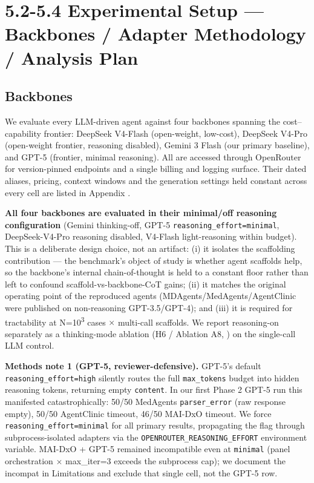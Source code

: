 \section{5.2-5.4 Experimental Setup --- Backbones / Adapter Methodology / Analysis Plan}\label{experimental-setup-backbones-adapter-methodology-analysis-plan}

\subsection{Backbones}\label{sec-5-2}

We evaluate every LLM-driven agent against four backbones spanning the
cost--capability frontier: DeepSeek V4-Flash (open-weight, low-cost), DeepSeek
V4-Pro (open-weight frontier, reasoning disabled), Gemini 3 Flash (our primary
baseline), and GPT-5 (frontier, minimal reasoning). All are accessed through
OpenRouter for version-pinned endpoints and a single billing and logging
surface. Their dated aliases, pricing, context windows and the generation
settings held constant across every cell are listed in Appendix
.

\textbf{All four backbones are evaluated in their minimal/off reasoning configuration} (Gemini thinking-off, GPT-5 \texttt{reasoning\_effort=minimal},
DeepSeek-V4-Pro reasoning disabled, V4-Flash light-reasoning within budget).
This is a deliberate design choice, not an artifact: (i) it isolates the scaffolding contribution --- the benchmark's object of study is whether agent
scaffolds help, so the backbone's internal chain-of-thought is held to a
constant floor rather than left to confound scaffold-vs-backbone-CoT gains;
(ii) it matches the original operating point of the reproduced agents
(MDAgents/MedAgents/AgentClinic were published on non-reasoning GPT-3.5/GPT-4);
and (iii) it is required for tractability at N=10\textsuperscript{3} cases \ensuremath{\times} multi-call
scaffolds. We report reasoning-on separately as a thinking-mode ablation
(H6 / Ablation A8, ) on the single-call LLM control.

\textbf{Methods note 1 (GPT-5, reviewer-defensive).} GPT-5's default
\texttt{reasoning\_effort=high} silently routes the full \texttt{max\_tokens} budget into
hidden reasoning tokens, returning empty \texttt{content}. In our first Phase 2 GPT-5
run this manifested catastrophically: 50/50 MedAgents \texttt{parser\_error} (raw
response empty), 50/50 AgentClinic timeout, 46/50 MAI-DxO timeout. We force
\texttt{reasoning\_effort=minimal} for all primary results, propagating the flag
through subprocess-isolated adapters via the \texttt{OPENROUTER\_REASONING\_EFFORT}
environment variable.
MAI-DxO + GPT-5 remained incompatible even at \texttt{minimal} (panel orchestration \ensuremath{\times}
max\_iter=3 exceeds the subprocess cap); we document the incompat in 
Limitations and exclude that single cell, not the GPT-5 row.

